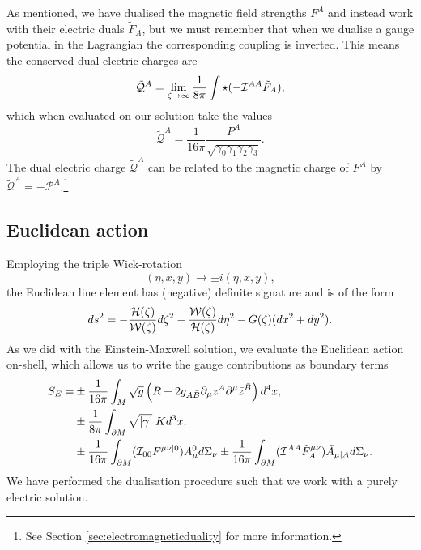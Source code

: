 As mentioned, we have dualised the magnetic field strengths $F^A$ and instead work with their electric duals $\tilde{F}_A$, but we must remember that when we dualise a gauge potential in the Lagrangian the corresponding coupling is inverted. This means the conserved dual electric charges are
\begin{equation*}
    \tilde{\mathcal{Q}}^A = \lim_{\zeta \rightarrow \infty} \frac{1}{8 \pi} \int \star (-{\cal I}^{AA} \tilde{F}_A),
\end{equation*}
which when evaluated on our solution take the values
\begin{equation}    
\label{eq:stup}    
    \tilde{\mathcal{Q}}^A = \frac{1}{16 \pi} \frac{P^A}{\sqrt{\gamma_0 \gamma_1 \gamma_2 \gamma_3}}.
\end{equation}
The dual electric charge $\tilde{\mathcal{Q}}^A$ can be related to the magnetic charge of $F^A$ by $\tilde{\mathcal{Q}}^A = - \mathcal{P}^A$.\footnote{See Section \ref{sec:electromagneticduality} for more information.}

\subsection{Euclidean action}
Employing the triple Wick-rotation
\begin{equation*}
    (\eta, x,y) \rightarrow \pm i (\eta, x, y),
\end{equation*}
the Euclidean line element has (negative) definite signature and is of the form
\begin{equation}
    ds^2  = - \frac{{\cal H}(\zeta)}{{\cal W}(\zeta)} d\zeta^2 - \frac{{\cal W}(\zeta)}{{\cal H}(\zeta)} d\eta^2 - G(\zeta)  (dx^2 + dy^2).
\end{equation}
As we did with the Einstein-Maxwell solution, we evaluate the Euclidean action on-shell, which allows us to write the gauge contributions as boundary terms
\begin{equation*}
\begin{aligned}
        S_E = &\pm \frac{1}{16\pi} \int_{M} \sqrt{g} \left( R + 2 g_{A\bar{B}} \partial_\mu z^A \partial^\mu \bar{z}^{\bar{B}} \right) d^4 x ,
        \\ &\pm \frac{1}{8\pi} \int_{\partial M} \sqrt{|\gamma|} \; K d^3x ,
        \\
        &\pm\frac{1}{16\pi} \int_{\partial M} ({\cal I}_{00} F^{\mu \nu | 0})A_\mu^0 d\Sigma_\nu \pm \frac{1}{16\pi} \int_{\partial M} ({\cal I}^{AA} \tilde{F}^{\mu \nu}_{A})\tilde{A}_{\mu | A} d\Sigma_\nu.
\end{aligned}
\end{equation*}
We have performed the dualisation procedure such that we work with a purely electric solution.

